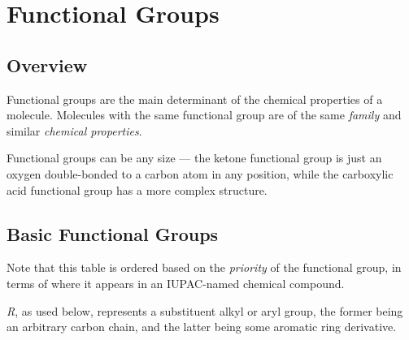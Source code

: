 

\pagebreak
\section{Functional Groups}

\subsection{Overview}

Functional groups are the main determinant of the chemical properties of a molecule. Molecules with the
same functional group are of the same \textit{family} and similar \textit{chemical properties}.

Functional groups can be any size –– the ketone functional group is just an oxygen double-bonded to a carbon atom
in any position, while the carboxylic acid functional group has a more complex structure.


\subsection{Basic Functional Groups}

Note that this table is ordered based on the \textit{priority} of the functional group, in terms of where it appears in
an IUPAC-named chemical compound.

\textit{R}, as used below, represents a substituent alkyl or aryl group, the former being an arbitrary carbon chain, and the
latter being some aromatic ring derivative.

